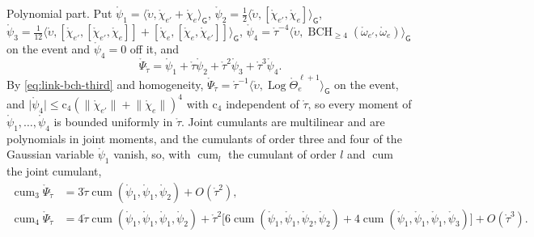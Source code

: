 Polynomial part. Put
\(\mathring\psi_1=\langle\mathring\upsilon,\mathring\chi_{e'}+\mathring\chi_e\rangle_{\mathsf G}\),
\(\mathring\psi_2=\frac12\langle\mathring\upsilon,[\mathring\chi_{e'},\mathring\chi_e]\rangle_{\mathsf G}\),
\(\mathring\psi_3=\frac1{12}\langle\mathring\upsilon,[\mathring\chi_{e'},[\mathring\chi_{e'},\mathring\chi_e]]+[\mathring\chi_e,[\mathring\chi_e,\mathring\chi_{e'}]]\rangle_{\mathsf G}\),
\(\mathring\psi_4=\mathring\tau^{-4}\langle\mathring\upsilon,\operatorname{BCH}_{\geq4}(\mathring\omega_{e'},\mathring\omega_e)\rangle_{\mathsf G}\)
on the event and \(\mathring\psi_4=0\) off it, and
\begin{equation}
\mathring\Psi_{\mathring\tau}=\mathring\psi_1+\mathring\tau\mathring\psi_2+\mathring\tau^2\mathring\psi_3+\mathring\tau^3\mathring\psi_4 .
\label{eq:link-coarse-polynomial-part}
\end{equation}
By \eqref{eq:link-bch-third} and homogeneity,
\(\mathring\Psi_{\mathring\tau}=\mathring\tau^{-1}\langle\mathring\upsilon,\operatorname{Log}\mathring\Theta^{\ell+1}_e\rangle_{\mathsf G}\)
on the event, and
\(\lvert\mathring\psi_4\rvert\leq\mathrm c_4(\lVert\mathring\chi_{e'}\rVert+\lVert\mathring\chi_e\rVert)^4\) with
\(\mathrm c_4\) independent of \(\mathring\tau\), so every moment of \(\mathring\psi_1,\ldots,\mathring\psi_4\) is
bounded uniformly in \(\mathring\tau\). Joint cumulants are multilinear and are polynomials in joint
moments, and the cumulants of order three and four of the Gaussian variable \(\mathring\psi_1\) vanish, so,
with \(\operatorname{cum}_l\) the cumulant of order \(l\) and \(\operatorname{cum}\) the joint cumulant,
\begin{equation}
\begin{aligned}
\operatorname{cum}_3\mathring\Psi_{\mathring\tau}
&=3\mathring\tau\operatorname{cum}(\mathring\psi_1,\mathring\psi_1,\mathring\psi_2)+O(\mathring\tau^2),\\
\operatorname{cum}_4\mathring\Psi_{\mathring\tau}
&=4\mathring\tau\operatorname{cum}(\mathring\psi_1,\mathring\psi_1,\mathring\psi_1,\mathring\psi_2)
+\mathring\tau^2\bigl[6\operatorname{cum}(\mathring\psi_1,\mathring\psi_1,\mathring\psi_2,\mathring\psi_2)
+4\operatorname{cum}(\mathring\psi_1,\mathring\psi_1,\mathring\psi_1,\mathring\psi_3)\bigr]+O(\mathring\tau^3).
\end{aligned}
\label{eq:link-coarse-cumulant-expansion}
\end{equation}

